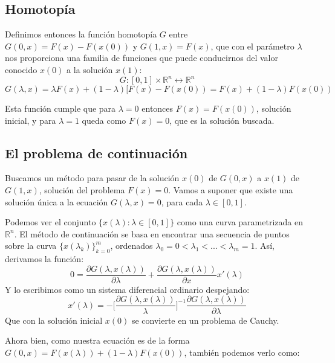\subsection{Homotopía}
Definimos entonces la función homotopía $G$ entre $G(0,x) = F(x)-F(x(0))$ y $G(1,x) = F(x)$, que con el parámetro $\lambda$ nos proporciona una familia de funciones que puede conducirnos del valor conocido $x(0)$ a la solución $x(1)$:
\[G:[0,1] \times \mathbb{R}^n \longleftrightarrow \mathbb{R}^n\]
\[G(\lambda,x) = \lambda F(x) + (1- \lambda) [F(x)- F(x(0)) = F(x) + (1-\lambda) F(x(0))\]

Esta función cumple que para $\lambda = 0$ entonces $F(x) = F(x(0))$, solución inicial, y para $\lambda = 1$ queda como $F(x) = 0$, que es la solución buscada.

\subsection{El problema de continuación}

Buscamos un método para pasar de la solución $x(0)$ de $G(0,x)$ a $x(1)$ de $G(1,x)$, solución del problema $F(x) = 0$. Vamos a suponer que existe una solución única a la ecuación $G(\lambda,x) = 0$, para cada $\lambda \in [0,1]$.

Podemos ver el conjunto $\{x(\lambda):\lambda \in [0,1]\}$ como una curva parametrizada en $\mathbb{R}^n$.
El método de continuación se basa en encontrar una secuencia de puntos sobre la curva $\{x(\lambda_k)\}_{k=0}^{m}$, ordenados $\lambda_0 = 0 < \lambda_1 <...< \lambda_m = 1$. Así, derivamos la función:
\[0 = \frac{\partial G(\lambda,x(\lambda))}{\partial \lambda} + \frac{\partial G(\lambda,x(\lambda))}{\partial x} x'(\lambda)\]
Y lo escribimos como un sistema diferencial ordinario despejando:
\[x'(\lambda) = -\Big[\frac{\partial G(\lambda,x(\lambda))}{\lambda}\Big]^{-1}\frac{\partial G(\lambda,x(\lambda))}{\partial \lambda}\]
Que con la solución inicial $x(0)$ se convierte en un problema de Cauchy.

Ahora bien, como nuestra ecuación es de la forma $G(0,x) = F(x(\lambda))+(1-\lambda)F(x(0))$, también podemos verlo como:

